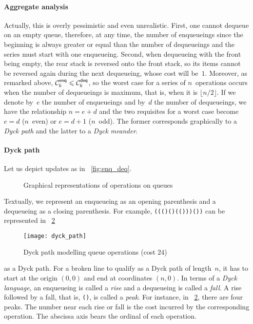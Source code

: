 \paragraph{Aggregate analysis}

Actually, this is overly pessimistic and even unrealistic. First, one
cannot dequeue on an empty queue, therefore, at any time, the number
of enqueueings since the beginning is always greater or equal than the
number of dequeueings and the series must start with one
enqueueing. Second, when dequeueing with the front being empty, the
rear stack is reversed onto the front stack, so its items cannot be
reversed again during the next dequeueing, whose cost will
be~\(1\). Moreover, as remarked above, \(\C{\fun{enq}}{k} \leqslant
\C{\fun{deq}}{k}\), so the worst case for a series of
\(n\)~operations occurs when the number of dequeueings is maximum,
that is, when it is \(\lfloor{n/2}\rfloor\). If we denote by~\(e\) the
number of enqueueings and by~\(d\) the number of dequeueings, we have
the relationship \(n = e + d\) and the two requisites for a worst case
become \(e=d\) (\(n\)~even) or \(e=d+1\) (\(n\)~odd). The former
corresponds graphically to a \emph{Dyck path} and the
latter to a \emph{Dyck meander}.

\paragraph{Dyck path}

Let us depict updates as in \fig~\vref{fig:enq_deq}.
\begin{figure}
\centering
{}
\qquad
{}
\caption{Graphical representations of operations on
  queues\label{fig:enq_deq}}
\end{figure}
Textually, we represent an enqueueing as an opening parenthesis and a
dequeueing as a closing parenthesis. For example,
\texttt{((()()(()))())} can be represented in \fig~\ref{fig:dyck_path}
\begin{figure}
\centering
\texttt{[image: dyck\_path]}
\caption{Dyck path modelling queue operations (cost \(24\))
\label{fig:dyck_path}}
\end{figure}
as a Dyck path. For a broken line to qualify
as a Dyck path of length~\(n\), it has to start at the origin
\((0,0)\) and end at coordinates \((n,0)\). In terms of a \emph{Dyck
  language}, an enqueueing is called a \emph{rise} and a dequeueing is called a \emph{fall}. A rise followed by a fall, that is, \texttt{()}, is
called a \emph{peak}. For instance, in
\fig~\ref{fig:dyck_path}, there are four peaks. The number near each
rise or fall is the cost incurred by the corresponding operation. The
abscissa axis bears the ordinal of each operation.

